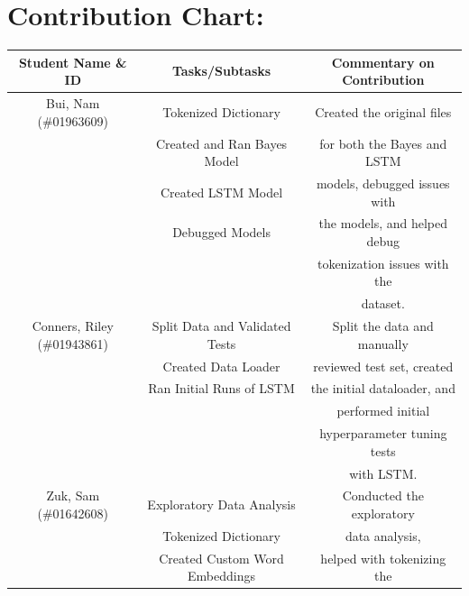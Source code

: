 \documentclass[11pt]{article}
\begin{document}
\section{Contribution Chart:}

\begin{table}[H]
    \centering
    \begin{tabular}{c|c|c}
        \hline
        Student Name \& ID          & Tasks/Subtasks                 & Commentary on Contribution   \\
        \hline
        Bui, Nam (\#01963609)       & Tokenized Dictionary           & Created the original files   \\
                                    & Created and Ran Bayes Model    & for both the Bayes and LSTM  \\
                                    & Created LSTM Model             & models, debugged issues with \\
                                    & Debugged Models                & the models, and helped debug \\
                                    &                                & tokenization issues with the \\
                                    &                                & dataset.                     \\
        \hline
        Conners, Riley (\#01943861) & Split Data and Validated Tests & Split the data and manually  \\
                                    & Created Data Loader            & reviewed test set, created   \\
                                    & Ran Initial Runs of LSTM       & the initial dataloader, and  \\
                                    &                                & performed initial            \\
                                    &                                & hyperparameter tuning tests  \\
                                    &                                & with LSTM.                   \\
        \hline
        Zuk, Sam (\#01642608)       & Exploratory Data Analysis      & Conducted the exploratory    \\
                                    & Tokenized Dictionary           & data analysis,               \\
                                    & Created Custom Word Embeddings & helped with tokenizing the   \\

\end{tabular}
\end{table}
\end{document}
